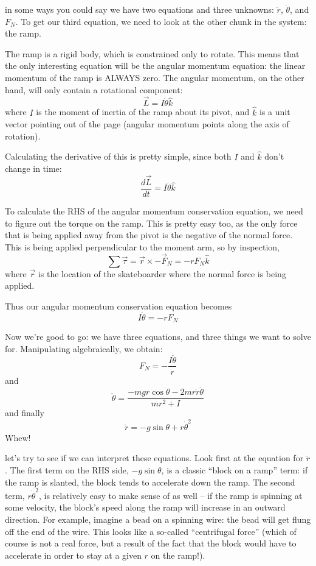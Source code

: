  in some ways you could say we have two equations and three unknowns: $\ddot{r}$, $\ddot{\theta}$, and $F_N$.  To get our third equation, we need to look at the other chunk in the system: the ramp.

The ramp is a rigid body, which is constrained only to rotate.  This means that the only interesting equation will be the angular momentum equation: the linear momentum of the ramp is ALWAYS zero.  The angular momentum, on the other hand, will only contain a rotational component:
$$\vec{L} = I \dot{\theta} \hat{k}$$
where $I$ is the moment of inertia of the ramp about its pivot, and $\hat{k}$ is a unit vector pointing out of the page (angular momentum points along the axis of rotation).  

Calculating the derivative of this is pretty simple, since both $I$ and $\hat{k}$ don't change in time:  
$$\frac{d\vec{L}}{dt} = I \ddot{\theta} \hat{k}$$

To calculate the RHS of the angular momentum conservation equation, we need to figure out the torque on the ramp.  This is pretty easy too, as the only force that is being applied away from the pivot is the negative of the normal force.  This is being applied perpendicular to the moment arm, so by inspection,
$$\sum \vec{\tau} = \vec{r} \times -\vec{F}_N = -rF_N\hat{k}$$
where $\vec{r}$ is the location of the skateboarder where the normal force is being applied.

Thus our angular momentum conservation equation becomes 
$$I\ddot{\theta} = -rF_N$$

Now we're good to go:  we have three equations, and three things we want to solve for.  Manipulating algebraically, we obtain:
$$F_N = -\frac{ I \ddot{\theta}}{r}$$
and
$$\ddot{\theta} = \frac{-mgr\cos\theta - 2mr\dot{r}\dot{\theta}}{mr^2 + I}$$
and finally 
$$\ddot{r} = -g \sin \theta + r\dot{\theta}^2$$
Whew!

 let's try to see if we can interpret these equations.  Look first at the equation for $\ddot{r}$.  The first term on the RHS side, $-g \sin \theta$,  is a classic ``block on a ramp'' term:  if the ramp is slanted, the block tends to accelerate down the ramp.  The second term, $r\dot{\theta}^2$, is relatively easy to make sense of as well -- if the ramp is spinning at some velocity, the block's speed along the ramp will increase in an outward direction.  For example, imagine a bead on a spinning wire: the bead will get flung off the end of the wire.  This looks like a so-called ``centrifugal force'' (which of course is not a real force, but a result of the fact that the block would have to accelerate in order to stay at a given $r$ on the ramp!).

